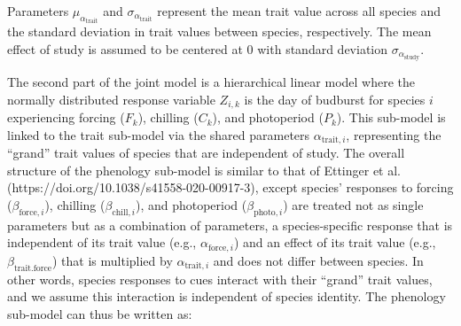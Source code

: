 \documentclass{article}\usepackage[]{graphicx}\usepackage[]{color}
\begin{document}
Parameters $\mu_{\alpha_{\text{trait}}}$ and $\sigma_{\alpha_{\text{trait}}}$ represent the mean trait value across all species and the standard deviation in trait values between species, respectively. The mean effect of study is assumed to be centered at $0$ with standard deviation $\sigma_{\alpha_{\text{study}}}$.

The second part of the joint model is a hierarchical linear model where the normally distributed response variable $Z_{i,k}$ is the day of budburst for species $i$ experiencing forcing ($F_k$), chilling ($C_k$), and photoperiod ($P_k$). This sub-model is linked to the trait sub-model via the shared parameters $\alpha_{\text{trait},i}$, representing the ``grand'' trait values of species that are independent of study. The overall structure of the phenology sub-model is similar to that of Ettinger et al. (https://doi.org/10.1038/s41558-020-00917-3), except species' responses to forcing ($\beta_{\text{force},i}$), chilling ($\beta_{\text{chill},i}$), and photoperiod ($\beta_{\text{photo},i}$) are treated not as single parameters but as a combination of parameters, a species-specific response that is independent of its trait value (e.g., $\alpha_{\text{force},i}$) and an effect of its trait value (e.g., $\beta_{\text{trait}.\text{force}}$) that is multiplied by $\alpha_{\text{trait},i}$ and does not differ between species. In other words, species responses to cues interact with their ``grand'' trait values, and we assume this interaction is independent of species identity. The phenology sub-model can thus be written as:
\end{document}
